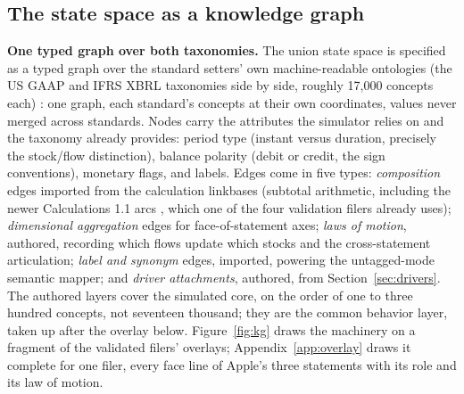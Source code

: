 \documentclass[11pt]{article}
\newcommand{\lead}[2]{\par\addvspace{5pt}\textbf{\textcolor{#1}{#2}}}
\begin{document}
\subsection{The state space as a knowledge graph}
\label{sec:kg}
\lead{navytwo}{One typed graph over both taxonomies.} The union state space is specified as a typed graph over the standard setters' own machine-readable ontologies (the US GAAP and IFRS XBRL taxonomies side by side, roughly 17{,}000 concepts each) \cite{usgaap, ifrstax}: one graph, each standard's concepts at their own coordinates, values never merged across standards. Nodes carry the attributes the simulator relies on and the taxonomy already provides: period type (instant versus duration, precisely the stock/flow distinction), balance polarity (debit or credit, the sign conventions), monetary flags, and labels. Edges come in five types: \emph{composition} edges imported from the calculation linkbases (subtotal arithmetic, including the newer Calculations 1.1 arcs \cite{calc11}, which one of the four validation filers already uses); \emph{dimensional aggregation} edges for face-of-statement axes; \emph{laws of motion}, authored, recording which flows update which stocks and the cross-statement articulation; \emph{label and synonym} edges, imported, powering the untagged-mode semantic mapper; and \emph{driver attachments}, authored, from Section~\ref{sec:drivers}. The authored layers cover the simulated core, on the order of one to three hundred concepts, not seventeen thousand; they are the common behavior layer, taken up after the overlay below. Figure~\ref{fig:kg} draws the machinery on a fragment of the validated filers' overlays; Appendix~\ref{app:overlay} draws it complete for one filer, every face line of Apple's three statements with its role and its law of motion.
\end{document}

